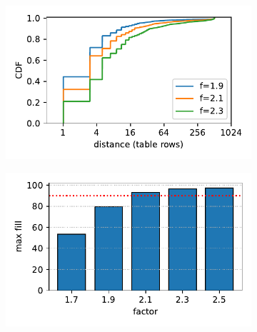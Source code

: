 \begin{figure}[t]
    \centering
    \begin{subfigure}{0.3\linewidth}
        \includegraphics[width=0.99\linewidth]{fig/hash_factor.pdf}
    \end{subfigure}
    \begin{subfigure}{0.3\linewidth}
        \includegraphics[width=0.99\linewidth]{fig/hash_fill.pdf}
    \end{subfigure}

\end{figure}
